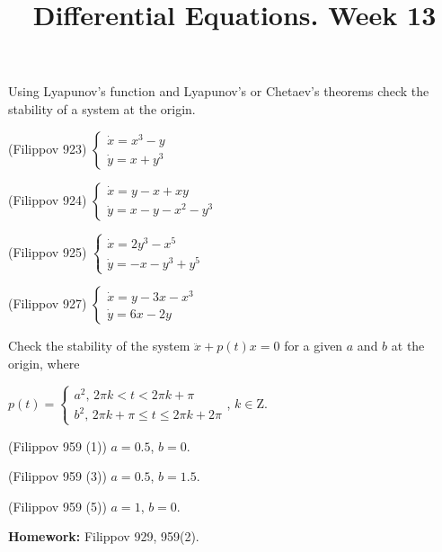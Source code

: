 \documentclass[14pt]{exam}
\title{Differential Equations. Week 13}
\date{}
\begin{document}
	\maketitle
	
	Using Lyapunov's function and Lyapunov's or Chetaev's theorems check the stability of a system at the origin.
	
	\begin{questions}
		\question
		(Filippov 923)
		$
		\begin{cases}
			\dot{x} = x^3 - y\\
			\dot{y} = x + y^3
		\end{cases}
		$
		
		\question
		(Filippov 924)
		$
		\begin{cases}
			\dot{x} = y - x + xy\\
			\dot{y} = x - y - x^2 - y^3
		\end{cases}
		$
		
		\question
		(Filippov 925)
		$
		\begin{cases}
			\dot{x} = 2y^3 - x^5\\
			\dot{y} = -x - y^3 + y^5
		\end{cases}
		$
		
		\question
		(Filippov 927)
		$
		\begin{cases}
			\dot{x} = y - 3x - x^3\\
			\dot{y} = 6x - 2y
		\end{cases}
		$
	\end{questions}
	
	Check the stability of the system $\ddot{x} + p(t)x = 0$  for a given $a$ and $b$ at the origin, where 
	
	$p(t) =  \begin{cases}
		a^2,\, 2\pi k < t < 2\pi k + \pi \\
		b^2,\, 2\pi k + \pi \leq t \leq 2\pi k + 2\pi
	\end{cases}$, $k\in\mathrm{Z}$.
	
	\begin{questions}
		\setcounter{question}{4}
		\question
		(Filippov 959 (1)) $a = 0.5$, $b = 0$.
		
		\question
		(Filippov 959 (3)) $a = 0.5$, $b = 1.5$.
		
		\question
		(Filippov 959 (5)) $a = 1$, $b = 0$.
	\end{questions}
	
	\textbf{Homework:} Filippov 929, 959(2).
\end{document}
